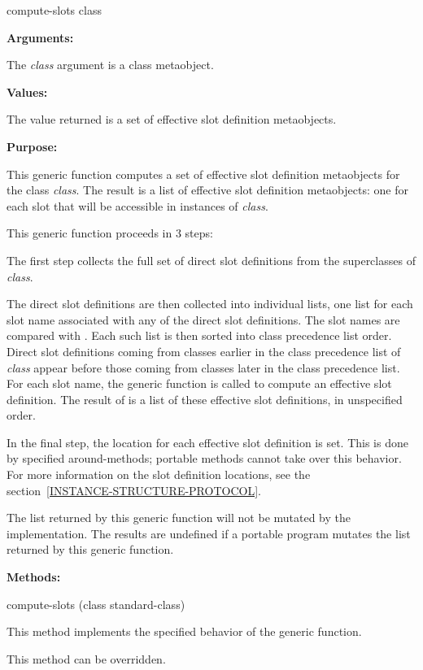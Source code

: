 \begin{defun}
compute-slots class

\textbf{Arguments:}

The \emph{class} argument is a class metaobject.

\textbf{Values:}

The value returned is a set of effective slot definition metaobjects.

\textbf{Purpose:}

This generic function computes a set of effective slot definition metaobjects
for the class \emph{class}. The result is a list of effective slot definition
metaobjects: one for each slot that will be accessible in instances of
\emph{class}.

This generic function proceeds in 3 steps:

The first step collects the full set of direct slot definitions from the
superclasses of \emph{class}.

The direct slot definitions are then collected into individual lists, one list
for each slot name associated with any of the direct slot definitions. The slot
names are compared with . Each such list is then sorted into class
precedence list order. Direct slot definitions coming from classes earlier in
the class precedence list of \emph{class} appear before those coming from
classes later in the class precedence list. For each slot name, the generic
function  is called to compute an
effective slot definition. The result of  is a list of these
effective slot definitions, in unspecified order.

In the final step, the location for each effective slot definition is set. This
is done by specified around-methods; portable methods cannot take over this
behavior. For more information on the slot definition locations, see the
section~\ref{INSTANCE-STRUCTURE-PROTOCOL}. 

The list returned by this generic function will not be mutated by the
implementation. The results are undefined if a portable program mutates the list
returned by this generic function.

\textbf{Methods:}

\begin{defun}
compute-slots (class standard-class)

This method implements the specified behavior of the generic function.

This method can be overridden.
\end{defun}


\end{defun}
